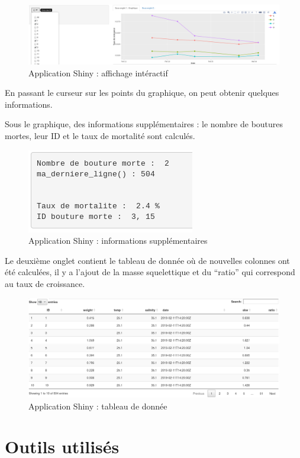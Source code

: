 \documentclass[]{report}
\begin{document}
\begin{figure}[h!]
\includegraphics[]{../image/shiny5.PNG}
\caption{Application Shiny : affichage intéractif}
\end{figure}

En passant le curseur sur les points du graphique, on peut obtenir
quelques informations.

Sous le graphique, des informations supplémentaires : le nombre de
boutures mortes, leur ID et le taux de mortalité sont calculés.

\begin{figure}[h!]
\includegraphics[]{../image/shiny7.PNG}
\caption{Application Shiny : informations supplémentaires}
\end{figure}

Le deuxième onglet contient le tableau de donnée où de nouvelles
colonnes ont été calculées, il y a l'ajout de la masse squelettique et
du ``ratio'' qui correspond au taux de croissance.

\begin{figure}[h!]
\includegraphics[]{../image/shiny8.PNG}
\caption{Application Shiny : tableau de donnée}
\end{figure}

\section{Outils utilisés}\label{outils-utilises}
\end{document}
